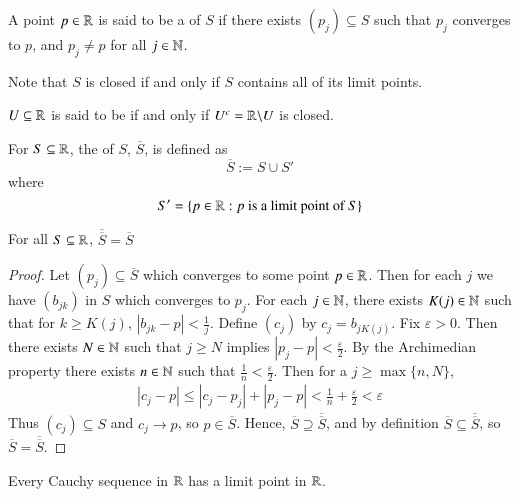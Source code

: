 \begin{definition}
    A point $p \in \mathbb R$ is said to be a  of $S$ if there exists $(p_j) \subseteq S$ such that $p_j$ converges to $p$, and $p_j \neq p$ for all $j \in \mathbb N$.
\end{definition}

Note that $S$ is closed if and only if $S$ contains all of its limit points.

\begin{definition}
    $U\subseteq \mathbb R$ is said to be  if and only if $U^c = \mathbb R\backslash U$ is closed.
\end{definition}

\begin{definition}
    For $S \subseteq \mathbb R$, the  of $S$, $\overline{S}$, is defined as $$\overline{S}:= S \cup S'$$ where $$S' = \{p \in \mathbb R: p \text{ is a limit point of } S\}$$
\end{definition}

\begin{proposition}
    For all $S \subseteq \mathbb R$, $\overline{\overline{S}} = \overline{S}$
\end{proposition}
\begin{proof}
    Let $(p_j) \subseteq \overline{S}$ which converges to some point $p \in \mathbb R$. Then for each $j$ we have $(b_{jk})$ in $S$ which converges to $p_j$. For each $j \in \mathbb N$, there exists $K(j) \in \mathbb N$ such that for $k \geq K(j)$, $|b_{jk} - p| < \frac{1}{j}$. Define $(c_j)$ by $c_j = b_{jK(j)}$. Fix $\varepsilon > 0$. Then there exists $N \in \mathbb N$ such that $j \geq N$ implies $|p_j - p| < \frac{\varepsilon}{2}$. By the Archimedian property there exists $n \in \mathbb N$ such that $\frac{1}{n} < \frac{\varepsilon}{2}$. Then for a $j \geq \max\{n,N\}$, \begin{align*}
        |c_j - p| \leq |c_j - p_j| + |p_j - p| < \frac{1}{n} + \frac{\varepsilon}{2} < \varepsilon
    \end{align*}
    Thus $(c_j) \subseteq S$ and $c_j\rightarrow p$, so $p \in \overline{S}$. Hence, $\overline{S}\supseteq \overline{\overline{S}}$, and by definition $\overline{S} \subseteq \overline{\overline{S}}$, so $\overline{S} = \overline{\overline{S}}$.
\end{proof}

\begin{theorem}\label{thm:1.9.1}
    Every Cauchy sequence in $\mathbb R$ has a limit point in $\mathbb R$.
\end{theorem}

